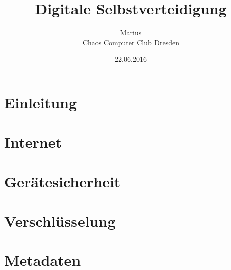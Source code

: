 \documentclass[12pt, xcolor={svgnames,table}]{beamer}
\title{Digitale Selbstverteidigung}
\author{\small Marius \\\large Chaos Computer Club Dresden}
\date{22.06.2016}
\begin{document}
\maketitle

\section{Einleitung}
\subsection{}


\section{Internet}
\subsection{}


\section{Gerätesicherheit}
\subsection{}


\section{Verschlüsselung}
\subsection{}


\section{Metadaten}
\end{document}
